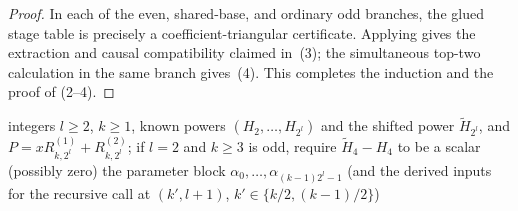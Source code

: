 \begin{proof}
      In each of the even, shared-base, and ordinary odd branches, the glued
      stage table is precisely a coefficient-triangular certificate.
      Applying  gives the extraction
      and causal compatibility claimed in~(3); the simultaneous top-two
      calculation in the same branch gives~(4).  This completes the
      induction and the proof of (2--4).

\end{proof}

\begin{algorithm}[H]
  \caption{Decoder summary for $xR^{(1)}_{k,2^l}+R^{(2)}_{k,2^l}$}\label{alg:decode-Rk2l}
  \begin{algorithmic}
    \Require integers $l\ge 2$, $k\ge 1$, known powers $(H_2,\ldots,H_{2^l})$ and the shifted power $\tilde H_{2^l}$, and $P=xR^{(1)}_{k,2^l}+R^{(2)}_{k,2^l}$; if $l=2$ and $k\ge3$ is odd, require $\tilde H_4-H_4$ to be a scalar (possibly zero)
    \Ensure the parameter block $\alpha_0,\ldots,\alpha_{(k-1)2^l-1}$ (and the derived inputs for the recursive call at $(k',l+1)$, $k'\in\{k/2,(k-1)/2\}$)


\end{algorithmic}
\end{algorithm}
